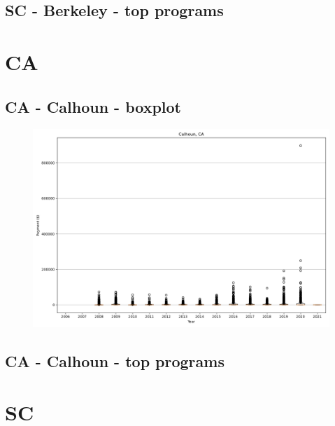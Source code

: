 \subsection*{SC - Berkeley - top programs}

\newpage
\section*{CA}
\subsection*{CA - Calhoun - boxplot}
\begin{figure}[h]
\centering
\includegraphics[width=7in]{../output/boxplots/counties/Calhoun-CA_boxplot.png}
\end{figure}


\subsection*{CA - Calhoun - top programs}

\newpage
\section*{SC}
